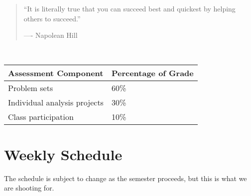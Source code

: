 \documentclass[]{book}
\begin{document}
\begin{quote}
``It is literally true that you can succeed best
and quickest by helping others to succeed.''

\hfill ---- Napolean Hill
\end{quote}

~

\begin{longtable}[]{@{}ll@{}}
\toprule
Assessment Component & Percentage of Grade\tabularnewline
\midrule
\endhead
Problem sets & 60\%\tabularnewline
Individual analysis projects & 30\%\tabularnewline
Class participation & 10\%\tabularnewline
\bottomrule
\end{longtable}

\hypertarget{weekly-schedule}{%
\section*{Weekly Schedule}\label{weekly-schedule}}

The schedule is subject to change as the semester proceeds, but this
is what we are shooting for.
\end{document}
